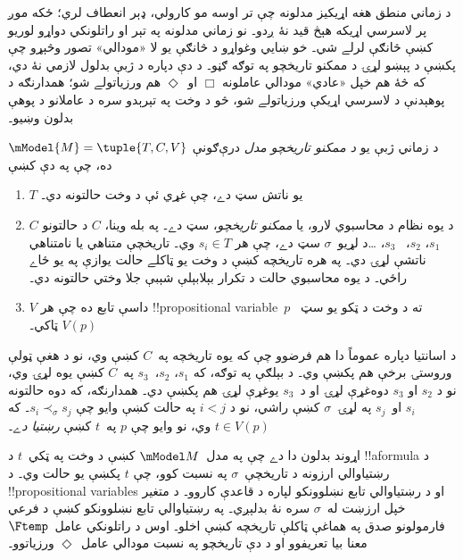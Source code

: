 \documentclass[../../../include/open-logic-section]{subfiles}
\begin{document}


د زماني منطق هغه اړيکيز مدلونه چې تر اوسه مو کارولي، ډېر انعطاف لري؛
ځکه موږ پر لاسرسي اړيکه هېڅ قيد نۀ ږدو۔ نو زماني مدلونه په تېر او
راتلونکي دواړو لوريو کښې څانګې لرلے شي۔ خو ښايي وغواړو د څانګې يو
لا «مودالي» تصور وڅېړو چې پکښې د پېښو لړۍ د ممکنو تاريخچو په توګه
ګڼو۔ د دې دپاره د ژبې بدلول لازمي نۀ دي، که څۀ هم خپل «عادي» مودالي
عاملونه $\Box$ او~$\Diamond$ هم ورزياتولے شو؛ همدارنګه د پوهېدنې
د لاسرسي اړيکې ورزياتولے شو، څو د وخت په تېرېدو سره د عاملانو د
پوهې بدلون وښيو۔

\begin{defn}
  د زماني ژبې يو \emph{د ممکنو تاريخچو مدل} درې‌ګونې
  $\mModel{M} = \tuple{T, C, V}$ ده، چې په دې کښې
  \begin{enumerate}
    \item $T$ يو ناتش سټ دے، چې غړي ئې د وخت حالتونه دي۔
    \item $C$ د يوه نظام د محاسبوي لارو، يا \emph{ممکنو
      تاريخچو}، سټ دے۔ په بله وينا، $C$ د حالتونو $s_1$، $s_2$،
      ~$s_3$، \dots د لړيو~$\sigma$ سټ دے، چې هر $s_i \in T$ وي۔
      تاريخچې متناهي يا نامتناهي ناتشې لړۍ دي۔ په هره تاريخچه
      کښې د وخت يو ټاکلے حالت يوازې په يو ځاے راځي۔ د يوه
      محاسبوي حالت د تکرار بېلابېلې شېبې جلا وختي حالتونه دي۔
    \item $V$ داسې تابع ده چې هر !!{propositional
      variable}~$p$ ته د وخت د ټکو يو سټ~$V(p)$ ټاکي۔
  \end{enumerate}
  د اسانتيا دپاره عموماً دا هم فرضوو چې که يوه تاريخچه په~$C$ کښې
  وي، نو د هغې ټولې وروستۍ برخې هم پکښې وي۔ د بېلګې په توګه،
  که $s_1$، $s_2$،~$s_3$ په~$C$ کښې يوه لړۍ وي، نو د $s_2$ او $s_3$
  دوه‌غړې لړۍ او د~$s_3$ يوغړې لړۍ هم پکښې دي۔ همدارنګه، که دوه حالتونه $s_i$ او~$s_j$
  په لړۍ~$\sigma$ کښې راشي، نو د $i < j$ په حالت کښې وايو چې
  $s_i \prec_\sigma s_j$۔ که $t \in V(p)$ وي، نو وايو چې $p$
  په~$t$ کښې \emph{رښتيا دے}۔
\end{defn}

اړوند بدلون دا دے چې په مدل~$\mModel M$ کښې د وخت په ټکي~$t$
د !!a{formula} د رښتياوالي ارزونه د تاريخچې~$\sigma$ په نسبت کوو، چې
$t$ پکښې يو حالت وي۔ د !!{propositional
variable}s او د
رښتياوالي تابع نښلوونکو لپاره د 
قاعدې کاروو۔ د متغير خپل ارزښت له~$\sigma$ سره نۀ بدلېږي۔
په رښتياوالي تابع نښلوونکو کښې د فرعي فارمولونو صدق په
هماغې ټاکلې تاريخچه کښې اخلو۔ اوس د راتلونکي عامل~$\Ftemp$
معنا بيا تعريفوو او د دې تاريخچو په نسبت مودالي عامل~$\Diamond$
ورزياتوو۔
\end{document}
